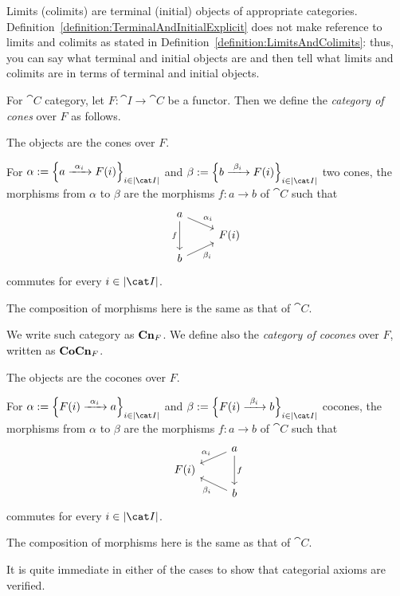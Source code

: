 Limits (colimits) are terminal (initial) objects of appropriate categories. Definition~\ref{definition:TerminalAndInitialExplicit} does not make reference to limits and colimits as stated in Definition~\ref{definition:LimitsAndColimits}: thus, you can say what terminal and initial objects are and then tell what limits and colimits are in terms of terminal and initial objects.

\begin{construction}
For \(\cat C\) category, let \(F : \cat I \to \cat C\) be a functor. Then we define the {\em category of cones} over \(F\) as follows.
\begin{tcbitem}
\item The objects are the cones over \(F\).
\item For \(\alpha := \set{a \functo{\alpha_i} F(i)}_{i \in \obj{\cat I}}\) and \(\beta := \set{b \functo{\beta_i} F(i)}_{i \in \obj{\cat I}}\) two cones, the morphisms from \(\alpha\) to \(\beta\) are the morphisms \(f : a \to b\) of \(\cat C\) such that
\[\begin{tikzcd}[row sep=tiny]
a \ar["{\alpha_i}", dr] \ar["f", dd, swap] \\
& F(i) \\
b \ar["{\beta_i}", ur, swap]
\end{tikzcd}\]
commutes for every \(i \in \obj{\cat I}\).
\item The composition of morphisms here is the same as that of \(\cat C\).
\end{tcbitem}
We write such category as \(\mathbf{Cn}_F\). We define also the {\em category of cocones} over \(F\), written as \(\mathbf{CoCn}_F\).
\begin{tcbitem}
\item The objects are the cocones over \(F\).
\item For \(\alpha := \set{F(i) \functo{\alpha_i} a}_{i \in \obj{\cat I}}\) and \(\beta := \set{F(i) \functo{\beta_i} b}_{i \in \obj{\cat I}}\) cocones, the morphisms from \(\alpha\) to \(\beta\) are the morphisms \(f : a \to b\) of \(\cat C\) such that
\[\begin{tikzcd}[row sep=tiny]
& a \ar["{\alpha_i}", dl, swap] \ar["f", dd] \\
F(i) \\
& b \ar["{\beta_i}", ul]
\end{tikzcd}\]
commutes for every \(i \in \obj{\cat I}\).
\item The composition of morphisms here is the same as that of \(\cat C\).
\end{tcbitem}
It is quite immediate in either of the cases to show that categorial axioms are verified.
\end{construction}

